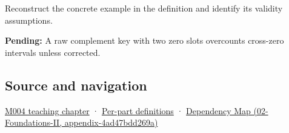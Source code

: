 Reconstruct the concrete example in the definition and identify its validity assumptions.

\textbf{Pending:} A raw complement key with two zero slots overcounts cross-zero intervals unless corrected.

\subsection{Source and navigation}\label{appendix-deca299ae4b8-source-and-navigation}

\hyperref[01-foundations-i-ch001-a-stretching-ruler-for-real-valued-quantities]{M004 teaching chapter} · \hyperref[appendix-fd090d982a15-m004---parts-61-76]{Per-part definitions} · \href{../02-Foundations-II/main.pdf\#nameddest=appendix-4ad47bdd269a}{Dependency Map (02-Foundations-II, appendix-4ad47bdd269a)}
